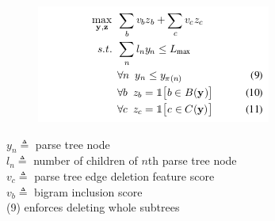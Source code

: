 \documentclass[xcolor={table}]{beamer}
\begin{document}
\begin{frame}[t]{\cite{berg2011jointly}}
      \begin{figure}[h]
          \centering
      \includegraphics[scale=.7]{images/obj-bergkirkpatrick11.png} \\
  \end{figure}
  $y_n \triangleq$ parse tree node  \\
  $l_n \triangleq$ number of children of $n$th parse tree node  \\
  $v_c \triangleq$ parse tree edge deletion feature score\\
  $v_b \triangleq$ bigram inclusion score\\
  (9) enforces deleting whole subtrees
\end{frame}
\end{document}
